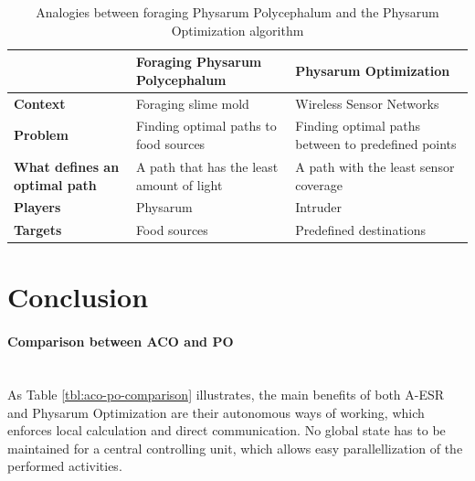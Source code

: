 \documentclass[cameraready]{IWORK2014}
\begin{document}
\begin{table}
    \centering
	\begin{tabularx}{0.90\textwidth}{|X|X|X|}
		\hline & \textbf{Foraging Physarum Polycephalum} & \textbf{Physarum Optimization} \\ \hline
		\textbf{Context} & Foraging slime mold & Wireless Sensor Networks \\ \hline
		\textbf{Problem} & Finding optimal paths to food sources & Finding optimal paths between to predefined points \\ \hline
		\textbf{What defines an optimal path} & A path that has the least amount of light & A path with the least sensor coverage \\ \hline
		\textbf{Players} & Physarum & Intruder \\ \hline
		\textbf{Targets} & Food sources & Predefined destinations \\ \hline
	\end{tabularx}
	\caption{Analogies between foraging Physarum Polycephalum and the Physarum Optimization algorithm}
	\label{tbl:analogies_physarum}
\end{table}

\section{Conclusion}

\paragraph{Comparison between ACO and PO}~\\
As Table \ref{tbl:aco-po-comparison} illustrates, the main benefits of both A-ESR and Physarum Optimization are their autonomous ways of working, which enforces local calculation and direct communication. No global state has to be maintained for a central controlling unit, which allows easy parallellization of the performed activities.
\end{document}
